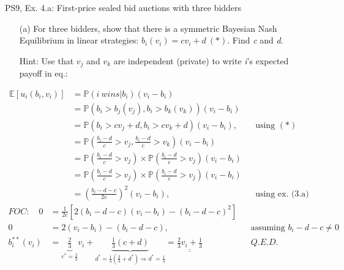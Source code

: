 \begin{frame}{PS9, Ex. 4.a: First-price sealed bid auctions with three bidders}
    \begin{itemize}
      \item[(a)] For three bidders, show that there is a symmetric Bayesian Nash Equilibrium in linear strategies: $b_i(v_i) = cv_i + d\ (*)$. Find \textit{c} and \textit{d}.
      \item[Hint:] Use that $v_j$ and $v_k$ are independent (private) to write \textit{i}'s expected payoff in eq.:
    \end{itemize}
    \vspace{-10pt}
    \begin{align*}
      \mathbb{E}[u_i(b_i,v_i)]
      &=\mathbb{P}(i\ wins|b_i)(v_i-b_i)\\
      &=\mathbb{P}\left(b_i>b_j(v_j),b_i>b_k(v_k)\right)(v_i-b_i)\\
      &=\mathbb{P}(b_i>cv_j+d,b_i>cv_k+d)(v_i-b_i),&&\text{using }(*)\\
      &=\mathbb{P}\left(\frac{b_i-d}{c}>v_j,\frac{b_i-d}{c}>v_k\right)(v_i-b_i)\\
      &=\mathbb{P}\left(\frac{b_i-d}{c}>v_j\right)\times\mathbb{P}\left(\frac{b_i-d}{c}>v_j\right)(v_i-b_i)\\
      &=\mathbb{P}\left(\frac{b_i-d}{c}>v_j\right)\times\mathbb{P}\left(\frac{b_i-d}{c}>v_j\right)(v_i-b_i)\\
      &=\left(\frac{b_i-d-c}{2c}\right)^2(v_i-b_i),&&\text{using ex. (3.a)}
    \end{align*}
    \vspace{-8pt}
    \begin{align*}
      FOC:\quad   0&=\frac{1}{2c}[2(b_i-d-c)(v_i-b_i)-(b_i-d-c)^2]\\
                  0&=2(v_i-b_i)-(b_i-d-c),&&\text{assuming }b_i-d-c\neq0\\
      b_i^{**}(v_i)&=\underbrace{\frac{2}{3}}_{c^{*}=\frac{2}{3}}v_i+\underbrace{\frac{1}{3}(c+d)}_{d^{*}=\frac{1}{3}\left(\frac{2}{3}+d^{*}\right)\Rightarrow d^{*}=\frac{1}{3}}=\underline{\underline{\frac{2}{3}v_i+\frac{1}{3}}}&&Q.E.D.
    \end{align*}
    \vfill\null
\end{frame}


